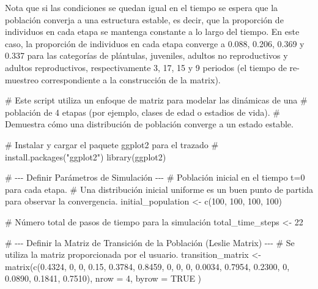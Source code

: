 \documentclass[
  12pt,
  letterpaper,
]{book}
\newenvironment{Shaded}{\begin{snugshade}}{\end{snugshade}}
\newcommand{\AttributeTok}[1]{\textcolor[rgb]{0.40,0.45,0.13}{#1}}
\newcommand{\CommentTok}[1]{\textcolor[rgb]{0.37,0.37,0.37}{#1}}
\newcommand{\ConstantTok}[1]{\textcolor[rgb]{0.56,0.35,0.01}{#1}}
\newcommand{\DecValTok}[1]{\textcolor[rgb]{0.68,0.00,0.00}{#1}}
\newcommand{\FloatTok}[1]{\textcolor[rgb]{0.68,0.00,0.00}{#1}}
\newcommand{\FunctionTok}[1]{\textcolor[rgb]{0.28,0.35,0.67}{#1}}
\newcommand{\NormalTok}[1]{\textcolor[rgb]{0.00,0.23,0.31}{#1}}
\newcommand{\OtherTok}[1]{\textcolor[rgb]{0.00,0.23,0.31}{#1}}
\begin{document}
Nota que si las condiciones se quedan igual en el tiempo se espera que
la población converja a una estructura estable, es decir, que la
proporción de individuos en cada etapa se mantenga constante a lo largo
del tiempo. En este caso, la proporción de individuos en cada etapa
converge a 0.088, 0.206, 0.369 y 0.337 para las categorías de plántulas,
juveniles, adultos no reproductivos y adultos reproductivos,
respectivamente 3, 17, 15 y 9 periodos (el tiempo de re-muestreo
correspondiente a la construcción de la matrix).

\begin{Shaded}
\begin{Highlighting}[]
\CommentTok{\# Este script utiliza un enfoque de matriz para modelar las dinámicas de una}
\CommentTok{\# población de 4 etapas (por ejemplo, clases de edad o estadios de vida).}
\CommentTok{\# Demuestra cómo una distribución de población converge a un estado estable.}

\CommentTok{\# Instalar y cargar el paquete ggplot2 para el trazado}
\CommentTok{\# install.packages("ggplot2")}
\FunctionTok{library}\NormalTok{(ggplot2)}

\CommentTok{\# {-}{-}{-} Definir Parámetros de Simulación {-}{-}{-}}
\CommentTok{\# Población inicial en el tiempo t=0 para cada etapa.}
\CommentTok{\# Una distribución inicial uniforme es un buen punto de partida para observar la convergencia.}
\NormalTok{initial\_population }\OtherTok{\textless{}{-}} \FunctionTok{c}\NormalTok{(}\DecValTok{100}\NormalTok{, }\DecValTok{100}\NormalTok{, }\DecValTok{100}\NormalTok{, }\DecValTok{100}\NormalTok{)}

\CommentTok{\# Número total de pasos de tiempo para la simulación}
\NormalTok{total\_time\_steps }\OtherTok{\textless{}{-}} \DecValTok{22}

\CommentTok{\# {-}{-}{-} Definir la Matriz de Transición de la Población (Leslie Matrix) {-}{-}{-}}
\CommentTok{\# Se utiliza la matriz proporcionada por el usuario.}
\NormalTok{transition\_matrix }\OtherTok{\textless{}{-}} \FunctionTok{matrix}\NormalTok{(}\FunctionTok{c}\NormalTok{(}\FloatTok{0.4324}\NormalTok{, }\DecValTok{0}\NormalTok{, }\DecValTok{0}\NormalTok{, }\FloatTok{0.15}\NormalTok{,}
                              \FloatTok{0.3784}\NormalTok{, }\FloatTok{0.8459}\NormalTok{, }\DecValTok{0}\NormalTok{, }\DecValTok{0}\NormalTok{,}
                              \DecValTok{0}\NormalTok{, }\FloatTok{0.0034}\NormalTok{, }\FloatTok{0.7954}\NormalTok{, }\FloatTok{0.2300}\NormalTok{,}
                              \DecValTok{0}\NormalTok{, }\FloatTok{0.0890}\NormalTok{, }\FloatTok{0.1841}\NormalTok{, }\FloatTok{0.7510}\NormalTok{),}
                    \AttributeTok{nrow =} \DecValTok{4}\NormalTok{,}
                    \AttributeTok{byrow =} \ConstantTok{TRUE}
\NormalTok{)}


\end{Highlighting}
\end{Shaded}
\end{document}
